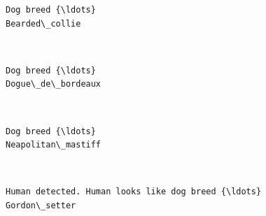 \documentclass[11pt]{article}
\begin{document}
    \begin{Verbatim}[commandchars=\\\{\}]
Dog breed {\ldots}
Bearded\_collie

    \end{Verbatim}

    \begin{center}
    \end{center}
    { \hspace*{\fill} \\}
    
    \begin{Verbatim}[commandchars=\\\{\}]
Dog breed {\ldots}
Dogue\_de\_bordeaux

    \end{Verbatim}

    \begin{center}
    \end{center}
    { \hspace*{\fill} \\}
    
    \begin{Verbatim}[commandchars=\\\{\}]
Dog breed {\ldots}
Neapolitan\_mastiff

    \end{Verbatim}

    \begin{center}
    \end{center}
    { \hspace*{\fill} \\}
    
    \begin{Verbatim}[commandchars=\\\{\}]
Human detected. Human looks like dog breed {\ldots}
Gordon\_setter

    \end{Verbatim}

    \begin{center}
    \end{center}
    { \hspace*{\fill} \\}
    
\end{document}
